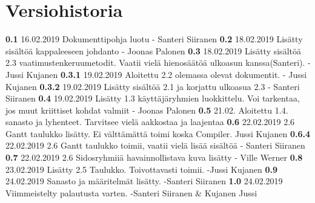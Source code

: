 \chapter*{Versiohistoria}

\newcommand{\currentversion}{1.0} %

\textbf{0.1} 16.02.2019 Dokumenttipohja luotu - Santeri Siiranen \newline
\textbf{0.2} 18.02.2019 Lisätty sisältöä kappaleeseen johdanto - Joonas Palonen \newline
\textbf{0.3} 18.02.2019 Lisätty sisältöä 2.3 vaatimustenkeruumetodit. Vaatii vielä hienosäätöä ulkoasun kanssa(Santeri). - Jussi Kujanen \newline
\textbf{0.3.1} 19.02.2019 Aloitettu 2.2 olemassa olevat dokumentit. - Jussi Kujanen \newline
\textbf{0.3.2} 19.02.2019 Lisätty sisältöä 2.1 ja korjattu ulkoasua 2.3 - Santeri Siiranen \newline
\textbf{0.4} 19.02.2019 Lisätty 1.3 käyttäjäryhmien luokkittelu. Voi tarkentaa, jos muut kriittiset kohdat valmiit - Joonas Palonen \newline
\textbf{0.5} 21.02. Aloitettu 1.4. sanasto ja lyhenteet. Tarvitsee vielä aakkostaa ja laajentaa \newline
\textbf{0.6} 22.02.2019 2.6 Gantt taulukko lisätty. Ei välttämättä toimi koska Compiler. Jussi Kujanen \newline
\textbf{0.6.4} 22.02.2019 2.6 Gantt taulukko toimii, vaatii vielä lisää sisältöä - Santeri Siiranen \newline
\textbf{0.7} 22.02.2019 2.6 Sidosryhmiiä havainnollistava kuva lisätty - Ville Werner \newline
\textbf{0.8} 23.02.2019 Lisätty 2.5 Taulukko. Toivottavasti toimii. -Jussi Kujanen \newline
\textbf{0.9} 24.02.2019 Sanasto ja määritelmät lisätty. -Santeri Siiranen \newline
\textbf{1.0} 24.02.2019 Viimmeistelty palautusta varten. -Santeri Siiranen \& Kujanen Jussi \newline 
